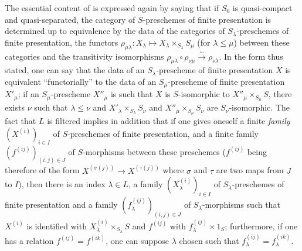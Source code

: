 \begin{env}[8.8.3]
\label{IV.8.8.3}
The essential content of  is expressed again by saying that if $S_0$ is quasi-compact and quasi-separated, the category of $S$-preschemes of finite presentation is determined up to equivalence by the data of the categories of $S_\lambda$-preschemes of finite presentation, the functors $\rho_{\mu\lambda}:X_\lambda\mapsto X_\lambda\times_{S_\lambda}S_\mu$ (for $\lambda\leqslant\mu$) between these categories and the transitivity isomorphisms $\rho_{\mu\lambda}\circ\rho_{\nu\mu}\xrightarrow{\sim}\rho_{\nu\lambda}$.
In the form thus stated, one can say that the data of an $S_\lambda$-prescheme of finite presentation $X$ is equivalent ``functorially'' to the data of an $S_\mu$-prescheme of finite presentation $X'_\mu$; if an $S_\mu$-prescheme $X''_\mu$ is such that $X$ is $S$-isomorphic to $X''_\mu\times_{S_\mu}S$, there exists $\nu$ such that $\lambda\leqslant\nu$ and $X'_\lambda\times_{S_\lambda}S_\nu$ and $X''_\mu\times_{S_\mu}S_\nu$ are $S_\nu$-isomorphic.
The fact that $L$ is filtered implies in addition that if one gives oneself a finite \emph{family} $(X^{(i)})_{i\in I}$ of $S$-preschemes of finite presentation, and a finite family $(f^{(ij)})_{(i,j)\in J}$ of $S$-morphisms between these preschemes ($f^{(ij)}$ being therefore of the form $X^{(\sigma(j))}\to X^{(\tau(j))}$ where $\sigma$ and $\tau$ are two maps from $J$ to $I$), then there is an index $\lambda\in L$, a family $(X^{(i)}_\lambda)_{i\in I}$ of $S_\lambda$-preschemes of finite presentation and a family $(f^{(ij)}_\lambda)_{(i,j)\in J}$ of $S_\lambda$-morphisms such that $X^{(i)}$ is identified with $X^{(i)}_\lambda\times_{S_\lambda}S$ and $f^{(ij)}$ with $f^{(ij)}_\lambda\times 1_S$; furthermore, if one has a relation $f^{(ij)}=f^{(ik)}$, one can suppose $\lambda$ chosen such that $f^{(ij)}_\lambda=f^{(ik)}_\lambda$.


\end{env}
